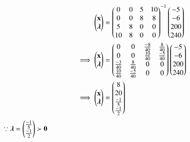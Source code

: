 \documentclass[journal,12pt,twocolumn]{IEEEtran}
\begin{document}
\begin{align}
    \begin{pmatrix}\mathbf{x} \\ \boldsymbol{\lambda}\end{pmatrix} &= \begin{pmatrix}0 & 0 & 5 & 10 \\ 0 & 0 & 8 & 8 \\ 5 & 8 & 0 & 0 \\ 10 & 8 & 0 & 0\end{pmatrix}^{-1}\begin{pmatrix}-5 \\ -6 \\ 200 \\ 240\end{pmatrix}
    \\
    \implies   \begin{pmatrix}\mathbf{x} \\ \boldsymbol{\lambda}\end{pmatrix} &= \begin{pmatrix}0 & 0 & \frac{-8}{40} & \frac{8}{40} \\ 0 & 0 & \frac{10}{40} & \frac{-5}{40} \\ \frac{-3}{40} & \frac{8}{40} & 0 & 0 \\ \frac{10}{40} & \frac{-5}{40} & 0 & 0\end{pmatrix}\begin{pmatrix}-5 \\ -6 \\ 200 \\ 240\end{pmatrix}
    \\
    \implies \begin{pmatrix}\mathbf{x} \\ \boldsymbol{\lambda}\end{pmatrix} &= \begin{pmatrix}8 \\ 20 \\ \frac{-1}{5} \\ \frac{-1}{2} \end{pmatrix}
\end{align}
$\because \boldsymbol{\lambda}=\begin{pmatrix}\frac{-1}{5} \\ \frac{-1}{2}\end{pmatrix} \succ \mathbf{0} $ 
\\
\end{document}
